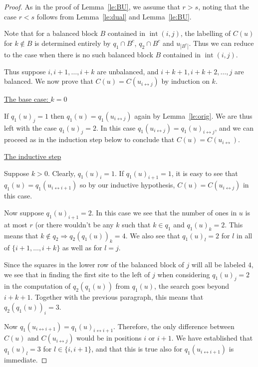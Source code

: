 \documentclass[reqno]{amsart}
\newcommand{\0}{\phantom{c}}
\DeclareMathOperator{\inter}{int} %
\theoremstyle{plain}
\theoremstyle{definition}
\numberwithin{equation}{section}
\begin{document}
\begin{proof}
  As in the proof of Lemma~\ref{le:BU}, we assume that $r > s$, noting that the case $r < s$ follows from Lemma~\ref{le:dual} and Lemma~\ref{le:BU}.
  
  Note that for a balanced block $B$ contained in $\inter(i,j)$, the labelling of $C(u)$ for $k \notin B$ is determined entirely by $q_1\cap B^c$, $q_2\cap B^c$ and $u_{|B^c|}$. Thus we can reduce to the case when there is no such balanced block $B$ contained in $\inter(i,j)$.  

  Thus suppose $i, i+1, \dotsc, i+k$ are unbalanced, and $i+k+1, i+k+2, \dotsc, j$ are balanced. We now prove that $C(u) = C(u_{i\leftrightarrow j})$ by induction on $k$. 
  
  \vspace{10pt}
  \noindent \underline{The base case: $k = 0$}

  If $q_1(u)_j = 1$ then $q_1(u) = q_1(u_{i\leftrightarrow j})$ again by Lemma~\ref{le:orig}. We are thus left with the case $q_1(u)_j = 2$. In this case $q_1(u_{i\leftrightarrow j}) = q_1(u)_{i\leftrightarrow j}$, and we can proceed as in the induction step below to conclude that $C(u) = C(u_{i\leftrightarrow})$.

  \vspace{10pt}
  \noindent \underline{The inductive step}

  Suppose $k > 0$. Clearly, $q_1(u)_i = 1$. If $q_1(u)_{i+1} = 1$, it is easy to see that $q_1(u) = q_1(u_{i\leftrightarrow i+1})$ so by our inductive hypothesis, $C(u) = C(u_{i\leftrightarrow j})$ in this case. 

  Now suppose $q_1(u)_{i+1} = 2$. In this case we see that the number of ones in $u$ is at most $r$ (or there wouldn't be any $k$ such that $k \in q_1$ and $q_1(u)_k=2$. This means that $k\notin q_2 \Rightarrow q_2(q_1(u))_k = 4$. We also see that $q_1(u)_l = 2$ for $l$ in all of $\{i+1,\dots, i+k\}$ as well as for $l= j$.

  Since the squares in the lower row of the balanced block of $j$ will all be labeled $4$, we see that in finding the first site to the left of $j$ when considering $q_1(u)_j = 2$ in the computation of $q_2(q_1(u))$ from $q_1(u)$, the search goes beyond $i+k+1$. Together with the previous paragraph, this means that $q_2(q_1(u))_i = 3$.

  Now $q_1(u_{i\leftrightarrow i+1}) = q_1(u)_{i\leftrightarrow i+1}$. Therefore, the only difference between $C(u)$ and $C(u_{i\leftrightarrow j})$ would be in positions $i$ or $i+1$. We have established that $q_1(u)_l = 3$ for $l \in \{i,i+1\}$, and that this is true also for $q_1(u_{i\leftrightarrow i+1})$ is immediate.

\end{proof}
\end{document}
